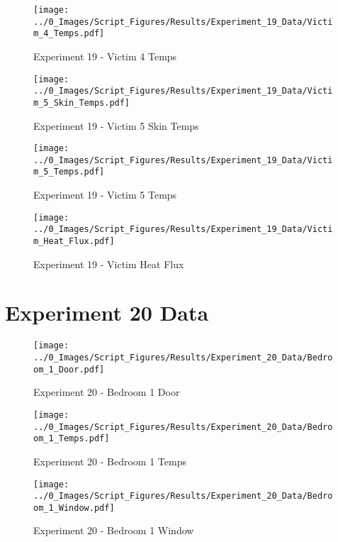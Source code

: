 	\begin{figure}[H]
		\centering
		\texttt{[image: ../0\_Images/Script\_Figures/Results/Experiment\_19\_Data/Victim\_4\_Temps.pdf]}
		\caption[]{Experiment 19 - Victim 4 Temps}
	\end{figure}
 
	\clearpage

	\begin{figure}[H]
		\centering
		\texttt{[image: ../0\_Images/Script\_Figures/Results/Experiment\_19\_Data/Victim\_5\_Skin\_Temps.pdf]}
		\caption[]{Experiment 19 - Victim 5 Skin Temps}
	\end{figure}
 

	\begin{figure}[H]
		\centering
		\texttt{[image: ../0\_Images/Script\_Figures/Results/Experiment\_19\_Data/Victim\_5\_Temps.pdf]}
		\caption[]{Experiment 19 - Victim 5 Temps}
	\end{figure}
 
	\clearpage

	\begin{figure}[H]
		\centering
		\texttt{[image: ../0\_Images/Script\_Figures/Results/Experiment\_19\_Data/Victim\_Heat\_Flux.pdf]}
		\caption[]{Experiment 19 - Victim Heat Flux}
	\end{figure}
 

\clearpage		\large
\section{Experiment 20 Data} \label{App:Exp20Results} 

	\begin{figure}[H]
		\centering
		\texttt{[image: ../0\_Images/Script\_Figures/Results/Experiment\_20\_Data/Bedroom\_1\_Door.pdf]}
		\caption[]{Experiment 20 - Bedroom 1 Door}
	\end{figure}
 

	\begin{figure}[H]
		\centering
		\texttt{[image: ../0\_Images/Script\_Figures/Results/Experiment\_20\_Data/Bedroom\_1\_Temps.pdf]}
		\caption[]{Experiment 20 - Bedroom 1 Temps}
	\end{figure}
 
	\clearpage

	\begin{figure}[H]
		\centering
		\texttt{[image: ../0\_Images/Script\_Figures/Results/Experiment\_20\_Data/Bedroom\_1\_Window.pdf]}
		\caption[]{Experiment 20 - Bedroom 1 Window}
	\end{figure}
 

